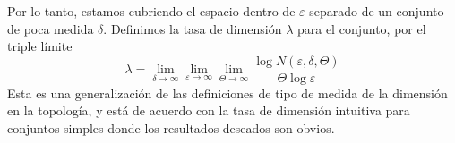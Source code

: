 \begin{appendices}
Por lo tanto, estamos cubriendo el espacio dentro de $\varepsilon$
separado de un conjunto de poca medida $\delta$. Definimos la tasa de
dimensi\'on $\lambda$ para el conjunto, por el triple l\'imite
\begin{equation} 
\lambda = 
\lim_{\delta \to \infty} 
\lim_{\varepsilon \to \infty} 
\lim_{\Theta \to \infty} 
\frac{\log N(\varepsilon, \delta, \Theta)}{\Theta \log
  \varepsilon} 
\end{equation} 
Esta es una generalizaci\'on de las definiciones de tipo de medida de
la dimensi\'on en la topolog\'ia, y est\'a de acuerdo con la tasa de
dimensi\'on intuitiva para conjuntos simples donde los resultados
deseados son obvios.

\end{appendices}
